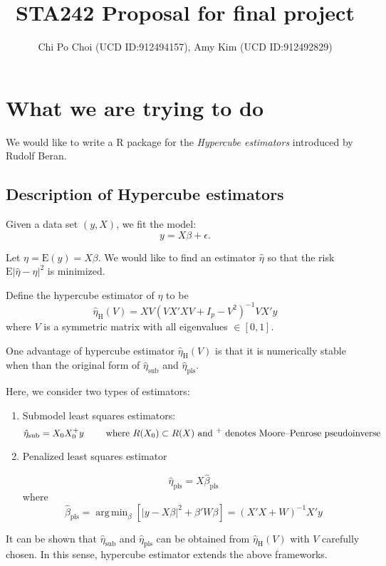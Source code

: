 \documentclass[draft]{article}
\title{STA242 Proposal for final project}
\author{Chi Po Choi (UCD ID:912494157), Amy Kim (UCD ID:912492829)}
\DeclareMathOperator*{\argmin}{arg\,min}
\begin{document}
\maketitle

\section{What we are trying to do}
We would like to write a R package for the \emph{Hypercube estimators} \cite{beran2014hypercube} introduced by Rudolf Beran. 

\subsection{Description of Hypercube estimators}
Given a data set $(y, X)$, we fit the model:
$$
y = X\beta + \epsilon.
$$

Let $\eta = \text{E}(y) = X\beta$. We would like to find an estimator $\hat{\eta}$ so that the risk $\text{E} | \hat{\eta} - \eta|^2$ is minimized. 

Define the hypercube estimator of $\eta$ to be
$$
\hat{\eta}_\text{H} (V) = X V (V X'X V + I_p - V^2)^{-1} V X' y
$$
where $V$ is a symmetric matrix with all eigenvalues $\in [0,1]$.

One advantage of hypercube estimator $\hat{\eta}_\text{H} (V)$ is that it is numerically stable when than the original form of $\hat{\eta}_\text{sub}$ and $\hat{\eta}_\text{pls}$.



Here, we consider two types of estimators:

\begin{enumerate}
	\item Submodel least squares estimators:
	$$
		\hat{\eta}_\text{sub} = X_0 X_0^+ y \qquad \text{ where $R(X_0) \subset R(X)$ and \textsuperscript{+} denotes Moore–Penrose pseudoinverse}
	$$
	\item Penalized least squares estimator

	$$
		\hat{\eta}_\text{pls} = X \hat{\beta}_\text{pls}
	$$
	where 
	$$
		\hat{\beta}_\text{pls} = \argmin_{\beta} [ | y - X\beta |^2 + \beta' W \beta ] = (X'X + W)^{-1} X' y 
	$$
\end{enumerate}

It can be shown that $\hat{\eta}_\text{sub}$ and $\hat{\eta}_\text{pls}$ can be obtained from $\hat{\eta}_\text{H} (V)$ with $V$ carefully chosen. In this sense, hypercube estimator extends the above frameworks.
\end{document}
